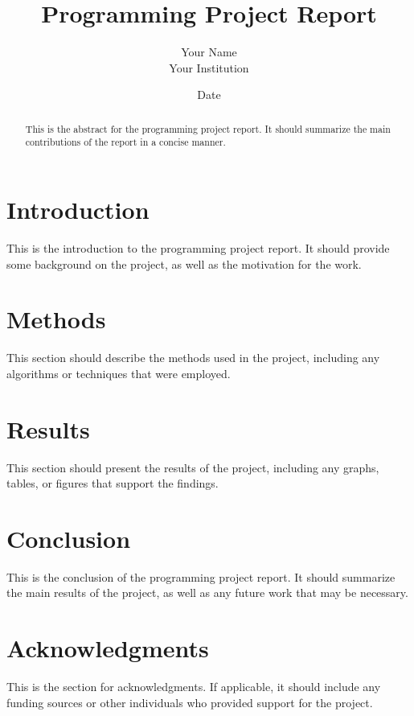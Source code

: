 \documentclass[11pt]{article}
\title{Programming Project Report}
\author{Your Name \\ Your Institution}
\date{Date}
\begin{document}
\maketitle

\begin{abstract}
This is the abstract for the programming project report. It should summarize the main contributions of the report in a concise manner.
\end{abstract}

\tableofcontents

\section{Introduction}

This is the introduction to the programming project report. It should provide some background on the project, as well as the motivation for the work.

\section{Methods}

This section should describe the methods used in the project, including any algorithms or techniques that were employed.

\section{Results}

This section should present the results of the project, including any graphs, tables, or figures that support the findings.

\section{Conclusion}

This is the conclusion of the programming project report. It should summarize the main results of the project, as well as any future work that may be necessary.

\section*{Acknowledgments}

This is the section for acknowledgments. If applicable, it should include any funding sources or other individuals who provided support for the project.



\end{document}
